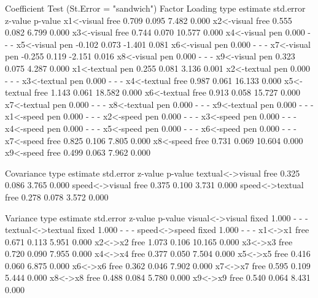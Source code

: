 \documentclass[nojss]{jss}
\begin{document}
\begin{Schunk}
\begin{Soutput}
Coefficient Test (St.Error = "sandwich")
  Factor Loading
                      type  estimate  std.error  z-value  p-value
       x1<-visual     free     0.709      0.095    7.482    0.000
       x2<-visual     free     0.555      0.082    6.799    0.000
       x3<-visual     free     0.744      0.070   10.577    0.000
       x4<-visual      pen     0.000        -        -        -  
       x5<-visual      pen    -0.102      0.073   -1.401    0.081
       x6<-visual      pen     0.000        -        -        -  
       x7<-visual      pen    -0.255      0.119   -2.151    0.016
       x8<-visual      pen     0.000        -        -        -  
       x9<-visual      pen     0.323      0.075    4.287    0.000
      x1<-textual      pen     0.255      0.081    3.136    0.001
      x2<-textual      pen     0.000        -        -        -  
      x3<-textual      pen     0.000        -        -        -  
      x4<-textual     free     0.987      0.061   16.133    0.000
      x5<-textual     free     1.143      0.061   18.582    0.000
      x6<-textual     free     0.913      0.058   15.727    0.000
      x7<-textual      pen     0.000        -        -        -  
      x8<-textual      pen     0.000        -        -        -  
      x9<-textual      pen     0.000        -        -        -  
        x1<-speed      pen     0.000        -        -        -  
        x2<-speed      pen     0.000        -        -        -  
        x3<-speed      pen     0.000        -        -        -  
        x4<-speed      pen     0.000        -        -        -  
        x5<-speed      pen     0.000        -        -        -  
        x6<-speed      pen     0.000        -        -        -  
        x7<-speed     free     0.825      0.106    7.805    0.000
        x8<-speed     free     0.731      0.069   10.604    0.000
        x9<-speed     free     0.499      0.063    7.962    0.000

  Covariance
                      type  estimate  std.error  z-value  p-value
 textual<->visual     free     0.325      0.086    3.765    0.000
   speed<->visual     free     0.375      0.100    3.731    0.000
  speed<->textual     free     0.278      0.078    3.572    0.000

  Variance
                      type  estimate  std.error  z-value  p-value
  visual<->visual    fixed     1.000        -        -        -  
textual<->textual    fixed     1.000        -        -        -  
    speed<->speed    fixed     1.000        -        -        -  
          x1<->x1     free     0.671      0.113    5.951    0.000
          x2<->x2     free     1.073      0.106   10.165    0.000
          x3<->x3     free     0.720      0.090    7.955    0.000
          x4<->x4     free     0.377      0.050    7.504    0.000
          x5<->x5     free     0.416      0.060    6.875    0.000
          x6<->x6     free     0.362      0.046    7.902    0.000
          x7<->x7     free     0.595      0.109    5.444    0.000
          x8<->x8     free     0.488      0.084    5.780    0.000
          x9<->x9     free     0.540      0.064    8.431    0.000


\end{Soutput}
\end{Schunk}
\end{document}
